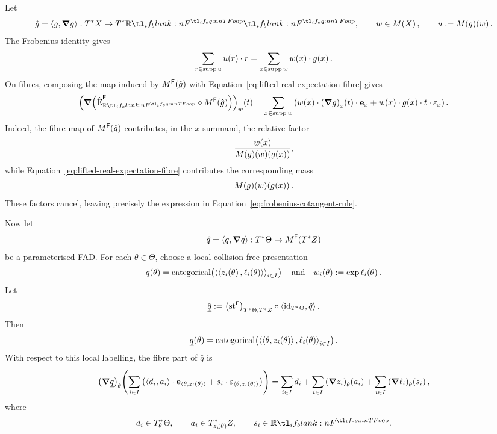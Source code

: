 \documentclass[11pt,a4paper]{article}
\theoremstyle{definition}
\theoremstyle{remark}
\providecommand{\id}{\mathrm{id}}
\providecommand{\supp}{\operatorname{supp}}
\providecommand{\categ}{\operatorname{categorical}}
\providecommand{\str}{\operatorname{st}}
\providecommand{\vect}[1]{\mathbf{#1}}
\begin{document}
Let
\[
\hat{g}=\tuple{g,\grad g}:T^{\ast}X\to\TR,
\qquad
w\in\Fun[nn]{M}{X},
\qquad
u:=\fn[p]{\Fun[nn]{M}{g}}{w}.
\]
The Frobenius identity gives
\begin{equation*}
	\sum_{r\in\supp u} \fn[n]{ u }{ r } \cdot r
	=
	\sum_{x\in\supp w} \fn[n]{ w }{ x } \cdot \fn[n]{ g }{ x }.
\end{equation*}
On fibres, composing the map induced by
\( \Fun[nn]{M^{\cat[]{F}}}{\hat{g}} \) with
Equation~\eqref{eq:lifted-real-expectation-fibre} gives
\begin{equation}
	\label{eq:frobenius-cotangent-rule}
	\fn[n]{
		\Nat[pn]{
			\grad \! \left(
			\hat{ \opn{E} }_{\R}^{\cat[]{F}}
			\circ
			\Fun[nn]{ M^{\cat[]{F}} }{ \hat{g} }
			\right)
		}{ w }
	}{t}
	=
	\sum_{x \in \supp w}
	\left(
	\fn[n]{ w }{ x } \cdot \fn[n]{ \Nat[pn]{ \grad g }{ x } }{ t } \cdot \vect{e}_x
	+
	\fn[n]{ w }{ x } \cdot \fn[n]{ g }{ x } \cdot t \cdot \vect{ \varepsilon }_x
	\right).
\end{equation}
Indeed, the fibre map of \( \Fun[nn]{M^{\cat[]{F}}}{\hat{g}} \) contributes,
in the \(x\)-summand, the relative factor
\[
\frac{\fn[n]{w}{x}}{\fn[p]{\fn[n]{\Fun{M}{g}}{w}}{\fn[n]{g}{x}}},
\]
while Equation~\eqref{eq:lifted-real-expectation-fibre} contributes the
corresponding mass
\[
\fn[p]{\fn[n]{\Fun{M}{g}}{w}}{\fn[n]{g}{x}}.
\]
These factors cancel, leaving precisely the expression in
Equation~\eqref{eq:frobenius-cotangent-rule}.

Now let
\[
\hat{q}
=
\tuple{ q, \grad q }:
T^{\ast} \Theta
\to
\Fun[np]{ M^{\cat[]{F}} }{ T^{\ast} Z }
\]
be a parameterised FAD. For each \( \theta\in\Theta \), choose a local
collision-free presentation
\begin{equation*}
	\fn[n]{ q }{ \theta } =
	\fn[n]{ \categ }{
		\tuple{
			\tuple{
				\fn[n]{ z_{i} }{ \theta },
				\fn[n]{ \ell_{i} }{ \theta }
			}
		}_{i \in I}
	}
	\qq{and}
	\fn[n]{ w_{i} }{ \theta } := \exp \fn[n]{ \ell_{i} }{ \theta } .
\end{equation*}
Let
\[
\hat{\underline q}
:=
\Nat[nn]{ \str^{\cat[]{F}} }{ T^{\ast} \Theta, T^{\ast} Z }
\circ
\tupling{ \id_{T^{\ast} \Theta}, \hat{q} } .
\]
Then
\[
\fn[n]{ \underline{q} }{ \theta }
=
\fn[n]{ \categ }{
	\tuple{
		\tuple{ \theta, \fn[n]{ z_{i} }{ \theta } },
		\fn[n]{ \ell_{i} }{ \theta }
	}_{i \in I}
}.
\]
With respect to this local labelling, the fibre part of
\(\hat{\underline{q}}\) is
\begin{equation}
	\label{eq:suggestive-fibre-parametrised-fad}
	\fn[n]{
		\Nat[pn]{ \grad \underline{q} }{ \theta }
	}{
		\sum_{i \in I}
		\left(
		\tuple{d_i,a_i} \cdot \vect{e}_{\tuple{\theta,z_i(\theta)}}
		+
		s_i\cdot\vect{ \varepsilon }_{\tuple{\theta,z_i(\theta)}}
		\right)
	}
	=
	\sum_{i\in I} d_i
	+
	\sum_{i \in I} \fn[n]{ \Nat[pn]{ \grad z_{i} }{ \theta } }{ a_{i} }
	+
	\sum_{i \in I} \fn[n]{ \Nat[pn]{ \grad \ell_{i} }{ \theta } }{ s_{i} },
\end{equation}
where
\[
d_i\in T^{\ast}_{\theta}\Theta,
\qquad
a_i\in T^{\ast}_{\fn[n]{z_i}{\theta}}Z,
\qquad
s_i\in\R .
\]
\end{document}
